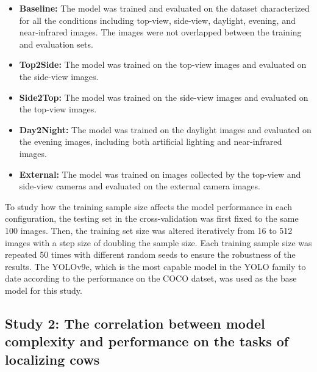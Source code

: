 \begin{itemize}
    \item \textbf{Baseline:} The model was trained and evaluated on the dataset characterized for all the conditions including top-view, side-view, daylight, evening, and near-infrared images. The images were not overlapped between the training and evaluation sets.
    \item \textbf{Top2Side:} The model was trained on the top-view images and evaluated on the side-view images.
    \item \textbf{Side2Top:} The model was trained on the side-view images and evaluated on the top-view images.
    \item \textbf{Day2Night:} The model was trained on the daylight images and evaluated on the evening images, including both artificial lighting and near-infrared images.
    \item \textbf{External:} The model was trained on images collected by the top-view and side-view cameras and evaluated on the external camera images.
\end{itemize}

To study how the training sample size affects the model performance in each configuration, the testing set in the cross-validation was first fixed to the same 100 images. Then, the training set size was altered iteratively from 16 to 512 images with a step size of doubling the sample size. Each training sample size was repeated 50 times with different random seeds to ensure the robustness of the results. The YOLOv9e, which is the most capable model in the YOLO family to date according to the performance on the COCO datset, was used as the base model for this study.


\subsection*{Study 2: The correlation between model complexity and performance on the tasks of localizing cows}

